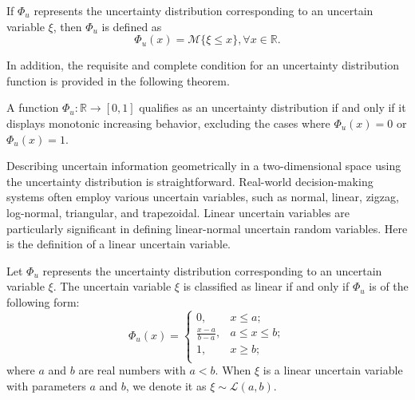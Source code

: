 \begin{definition}\cite{Liu 2015}\label{def.7}
	If $\Phi_u$ represents the uncertainty distribution corresponding to an uncertain variable $\xi$, then $\Phi_u$ is defined as
	\begin{equation*}
		\Phi_u(x)=\mathcal{M}\{\xi\le x\},\forall x\in \mathbb{R}.
	\end{equation*}
\end{definition}
\par In addition, the requisite and complete condition for an uncertainty distribution function is provided in the following theorem.
\begin{theorem}\cite{Liu 2015}\label{thm.2}
	A function $\Phi_u:\mathbb{R}\to[0,1]$ qualifies as an uncertainty distribution if and only if it displays monotonic increasing behavior, excluding the cases where $\Phi_u(x)=0$ or $\Phi_u(x)=1.$
\end{theorem}
\par Describing uncertain information geometrically in a two-dimensional space using the uncertainty distribution is straightforward. Real-world decision-making systems often employ various uncertain variables, such as normal, linear, zigzag, log-normal, triangular, and trapezoidal. Linear uncertain variables are particularly significant in defining linear-normal uncertain random variables. Here is the definition of a linear uncertain variable.
\begin{definition}\cite{Liu 2015}\label{def.8}
	Let $\Phi_u$ represents the uncertainty distribution corresponding to an uncertain variable $\xi$. The uncertain variable $\xi$ is classified as linear if and only if $\Phi_u$ is of the following form:\\
	\[\Phi_u(x)=\left\{
	\begin{array}{ll}
		0, & x\leq a;\\
		\frac{x-a}{b-a}, & a\leq x\leq b;\\
		1, & x \geq b;\\
	\end{array}
	\right.
	\]
where $a$ and $b$ are real numbers with $a < b$. When $\xi$ is a linear uncertain variable with parameters $a$ and $b$, we denote it as $\xi\sim \mathcal{L}(a,b)$.
\end{definition}
